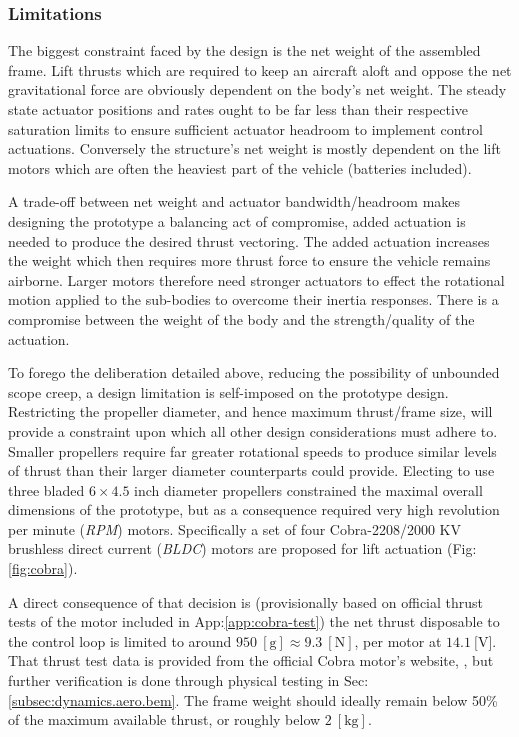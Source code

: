 \subsubsection{Limitations}
\label{subsubsec:intro.foreword.limits}
The biggest constraint faced by the design is the net weight of the assembled frame. Lift thrusts which are required to keep an aircraft aloft and oppose the net gravitational force are obviously dependent on the body's net weight. The steady state actuator positions and rates ought to be far less than their respective saturation limits to ensure sufficient actuator headroom to implement control actuations. Conversely the structure's net weight is mostly dependent on the lift motors which are often the heaviest part of the vehicle (batteries included). 
\par
A trade-off between net weight and actuator bandwidth/headroom makes designing the prototype a balancing act of compromise, added actuation is needed to produce the desired thrust vectoring. The added actuation increases the weight which then requires more thrust force to ensure the vehicle remains airborne. Larger motors therefore need stronger actuators to effect the rotational motion applied to the sub-bodies to overcome their inertia responses. There is a compromise between the weight of the body and the strength/quality of the actuation.
\par
To forego the deliberation detailed above, reducing the possibility of unbounded scope creep, a design limitation is self-imposed on the prototype design. Restricting the propeller diameter, and hence maximum thrust/frame size, will provide a constraint upon which all other design considerations must adhere to. Smaller propellers require far greater rotational speeds to produce similar levels of thrust than their larger diameter counterparts could provide. Electing to use three bladed $6\times 4.5$ inch diameter propellers constrained the maximal overall dimensions of the prototype, but as a consequence required very high revolution per minute (\emph{RPM}) motors. Specifically a set of four Cobra-2208/2000 KV \cite{cobramotor} brushless direct current (\emph{BLDC}) motors are proposed for lift actuation (Fig:\ref{fig:cobra}). 
\par
A direct consequence of that decision is (provisionally based on official thrust tests of the motor included in App:\ref{app:cobra-test}) the net thrust disposable to the control loop is limited to around $950~[\text{g}]\approx 9.3~[\text{N}]$, per motor at $14.1~[\text{V}$]. That thrust test data is provided from the official Cobra motor's website, \cite{cobramotor}, but further verification is done through physical testing in Sec:\ref{subsec:dynamics.aero.bem}. The frame weight should ideally remain below 50\% of the maximum available thrust, or roughly below $2~[\text{kg}]$.
